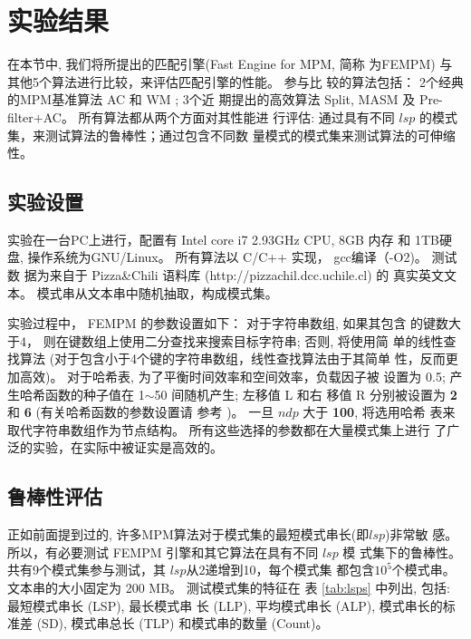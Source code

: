 \section{实验结果}
\label{sec:2_experiments}

在本节中, 我们将所提出的匹配引擎(Fast Engine for MPM, 简称
为\textsf{FEMPM}) 与其他5个算法进行比较，来评估匹配引擎的性能。 参与比
较的算法包括： 2个经典的MPM基准算法 \textsf{AC} 和 \textsf{WM} ; 3个近
期提出的高效算法 \textsf{Split},
\textsf{MASM} 及 \textsf{Pre-filter+AC}。 所有算法都从两个方面对其性能进
行评估: 通过具有不同 $lsp$ 的模式集，来测试算法的鲁棒性；通过包含不同数
量模式的模式集来测试算法的可伸缩性。

\subsection{实验设置}


实验在一台PC上进行，配置有 Intel core i7 2.93GHz CPU, 8GB 内存 和 1TB硬
盘, 操作系统为GNU/Linux。 所有算法以 C/C++ 实现， gcc编译（-O2)。 测试数
据为来自于 Pizza\;\&\;Chili 语料库 (http://pizzachil.dcc.uchile.cl) 的
真实英文文本。 模式串从文本串中随机抽取，构成模式集。

实验过程中， \textsf{FEMPM} 的参数设置如下： 对于字符串数组, 如果其包含
的键数大于4， 则在键数组上使用二分查找来搜索目标字符串; 否则, 将使用简
单的线性查找算法 (对于包含小于4个键的字符串数组，线性查找算法由于其简单
性，反而更加高效)。 对于哈希表, 为了平衡时间效率和空间效率，负载因子被
设置为 0.5; 产生哈希函数的种子值在 1$\sim$50 间随机产生; 左移值 L 和右
移值 R 分别被设置为 \textbf{2} 和 \textbf{6} (有关哈希函数的参数设置请
参考 \cite{Ramakrishna1997})。 一旦 $ndp$ 大于 \textbf{100}, 将选用哈希
表来取代字符串数组作为节点结构。 所有这些选择的参数都在大量模式集上进行
了广泛的实验，在实际中被证实是高效的。

\subsection{鲁棒性评估}

正如前面提到过的, 许多MPM算法对于模式集的最短模式串长(即$lsp$)非常敏
感。 所以，有必要测试 \textsf{FEMPM} 引擎和其它算法在具有不同 $lsp$ 模
式集下的鲁棒性。 共有9个模式集参与测试，其 $lsp$从2递增到10，每个模式集
都包含$10^5$个模式串。 文本串的大小固定为 200 MB。 测试模式集的特征在
表 \ref{tab:lsps} 中列出, 包括: 最短模式串长 (LSP), 最长模式串
长 (LLP), 平均模式串长 (ALP), 模式串长的标准差 (SD), 模式串总长 (TLP)
和模式串的数量 (Count)。

